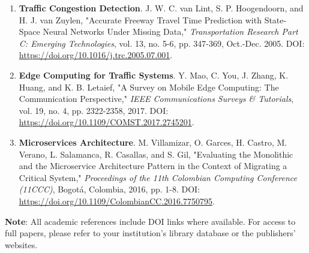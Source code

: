 \begin{enumerate}[resume]
    \item \textbf{Traffic Congestion Detection}. J. W. C. van Lint, S. P. Hoogendoorn, and H. J. van Zuylen, 
    "Accurate Freeway Travel Time Prediction with State-Space Neural Networks Under Missing Data," 
    \textit{Transportation Research Part C: Emerging Technologies}, vol. 13, no. 5-6, pp. 347-369, Oct.-Dec. 2005. 
    DOI: \url{https://doi.org/10.1016/j.trc.2005.07.001}.
    
    \item \textbf{Edge Computing for Traffic Systems}. Y. Mao, C. You, J. Zhang, K. Huang, and K. B. Letaief, 
    "A Survey on Mobile Edge Computing: The Communication Perspective," 
    \textit{IEEE Communications Surveys \& Tutorials}, vol. 19, no. 4, pp. 2322-2358, 2017. 
    DOI: \url{https://doi.org/10.1109/COMST.2017.2745201}.
    
    \item \textbf{Microservices Architecture}. M. Villamizar, O. Garces, H. Castro, M. Verano, L. Salamanca, R. Casallas, and S. Gil, 
    "Evaluating the Monolithic and the Microservice Architecture Pattern in the Context of Migrating a Critical System," 
    \textit{Proceedings of the 11th Colombian Computing Conference (11CCC)}, 
    Bogotá, Colombia, 2016, pp. 1-8. DOI: \url{https://doi.org/10.1109/ColombianCC.2016.7750795}.
\end{enumerate}

\vspace{0.5cm}
\textbf{Note}: All academic references include DOI links where available. 
For access to full papers, please refer to your institution's library database or the publishers' websites.

